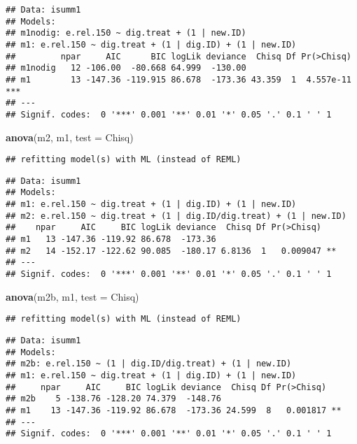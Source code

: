 \documentclass[
]{article}
\newenvironment{Shaded}{\begin{snugshade}}{\end{snugshade}}
\newcommand{\AttributeTok}[1]{\textcolor[rgb]{0.13,0.29,0.53}{#1}}
\newcommand{\FunctionTok}[1]{\textcolor[rgb]{0.13,0.29,0.53}{\textbf{#1}}}
\newcommand{\NormalTok}[1]{#1}
\newcommand{\StringTok}[1]{\textcolor[rgb]{0.31,0.60,0.02}{#1}}
\begin{document}
\begin{verbatim}
## Data: isumm1
## Models:
## m1nodig: e.rel.150 ~ dig.treat + (1 | new.ID)
## m1: e.rel.150 ~ dig.treat + (1 | dig.ID) + (1 | new.ID)
##         npar     AIC      BIC logLik deviance  Chisq Df Pr(>Chisq)    
## m1nodig   12 -106.00  -80.668 64.999  -130.00                         
## m1        13 -147.36 -119.915 86.678  -173.36 43.359  1  4.557e-11 ***
## ---
## Signif. codes:  0 '***' 0.001 '**' 0.01 '*' 0.05 '.' 0.1 ' ' 1
\end{verbatim}

\begin{Shaded}
\begin{Highlighting}[]
\FunctionTok{anova}\NormalTok{(m2, m1, }\AttributeTok{test =} \StringTok{\textquotesingle{}Chisq\textquotesingle{}}\NormalTok{)}
\end{Highlighting}
\end{Shaded}

\begin{verbatim}
## refitting model(s) with ML (instead of REML)
\end{verbatim}

\begin{verbatim}
## Data: isumm1
## Models:
## m1: e.rel.150 ~ dig.treat + (1 | dig.ID) + (1 | new.ID)
## m2: e.rel.150 ~ dig.treat + (1 | dig.ID/dig.treat) + (1 | new.ID)
##    npar     AIC     BIC logLik deviance  Chisq Df Pr(>Chisq)   
## m1   13 -147.36 -119.92 86.678  -173.36                        
## m2   14 -152.17 -122.62 90.085  -180.17 6.8136  1   0.009047 **
## ---
## Signif. codes:  0 '***' 0.001 '**' 0.01 '*' 0.05 '.' 0.1 ' ' 1
\end{verbatim}

\begin{Shaded}
\begin{Highlighting}[]
\FunctionTok{anova}\NormalTok{(m2b, m1, }\AttributeTok{test =} \StringTok{\textquotesingle{}Chisq\textquotesingle{}}\NormalTok{)}
\end{Highlighting}
\end{Shaded}

\begin{verbatim}
## refitting model(s) with ML (instead of REML)
\end{verbatim}

\begin{verbatim}
## Data: isumm1
## Models:
## m2b: e.rel.150 ~ (1 | dig.ID/dig.treat) + (1 | new.ID)
## m1: e.rel.150 ~ dig.treat + (1 | dig.ID) + (1 | new.ID)
##     npar     AIC     BIC logLik deviance  Chisq Df Pr(>Chisq)   
## m2b    5 -138.76 -128.20 74.379  -148.76                        
## m1    13 -147.36 -119.92 86.678  -173.36 24.599  8   0.001817 **
## ---
## Signif. codes:  0 '***' 0.001 '**' 0.01 '*' 0.05 '.' 0.1 ' ' 1
\end{verbatim}
\end{document}
